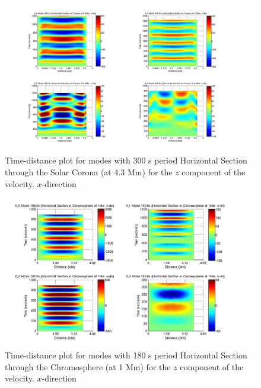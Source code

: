 \documentclass[preprint,authoryear,12pt]{elsarticle}
\begin{document}
\begin{figure}[h]
\includegraphics[scale=0.3]{imrescale/dt_300_hor_x_4p3Mm.jpg}
\caption{Time-distance plot for modes with 300 s period Horizontal Section through the Solar Corona (at 4.3 Mm) for the $z$ component of the velocity. $x$-direction}
\end{figure}


\begin{figure}[h]
\includegraphics[scale=0.45]{imrescale/dt_180_horiz_x_1Mm.jpg}
\caption{Time-distance plot for modes with 180 s period Horizontal Section through the Chromosphere (at 1 Mm) for the $z$ component of the velocity. $x$-direction}
\label{Fig14}
\end{figure}
\end{document}
